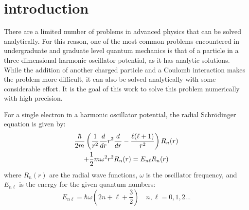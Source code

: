 \documentclass[prc,amsmath,twocolumn,superscriptaddress]{revtex4}
\begin{document}
\begin{abstract}
 \\ {\bf Conclusions:} Our results demonstrate that the effect of including a Coulomb repulsion interaction is a more diffuse wave function as the electrons are repelled from one another. On the other hand, our results alse demonstrate that as the oscillator potential becomes stronger the electrons are forced closer to one another.
\end{abstract}


\maketitle

\section{introduction}
\label{intro}
There are a limited number of problems in advanced physics that can be solved analytically. For this reason, one of the most common problems encountered in undergraduate and graduate level quantum mechanics is that of a particle in a three dimensional harmonic oscillator potential, as it has analytic solutions. While the addition of another charged particle and a Coulomb interaction makes the problem more difficult, it can also be solved analytically with some considerable effort. It is the goal of this work to solve this problem numerically with high precision.

For a single electron in a harmonic oscillator potential, the radial Schr{\"o}dinger equation is given by:
\begin{gather}
\frac{\hbar}{2m}\left(\frac{1}{r^2}\frac{d}{dr}r^2\frac{d}{dr}-\frac{\ell(\ell+1)}{r^2}\right)R_n(r) \notag \\
+\frac{1}{2}m\omega^2r^2 R_n(r)=E_{n\ell}R_n(r)
\end{gather}
where $R_n(r)$ are the radial wave functions, $\omega$ is the oscillator frequency, and $E_{n\ell}$ is the energy for the given quantum numbers:
\begin{equation}
E_{n\ell}=\hbar\omega\left(2n+\ell+\frac{3}{2}\right) \quad n,\ell = 0,1,2...
\end{equation}
\end{document}

